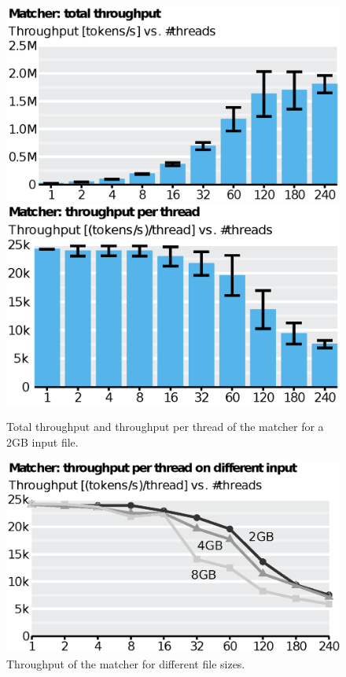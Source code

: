 \begin{figure}
      \includegraphics[scale=.45]{img/def/matcher_tp_total.eps}
      \includegraphics[scale=.45]{img/def/matcher_tp_per_thread.eps}
    \caption{Total throughput and throughput per thread of the matcher 
    for a 2GB input file.}
      \label{fig:matchertp}%
\end{figure}

\begin{figure}
    \includegraphics[scale=.45]{img/def/matcher_tp_compare.eps}
    \caption{Throughput of the matcher for different file sizes.}
    \label{fig:tkmatchercomp}
\end{figure}

